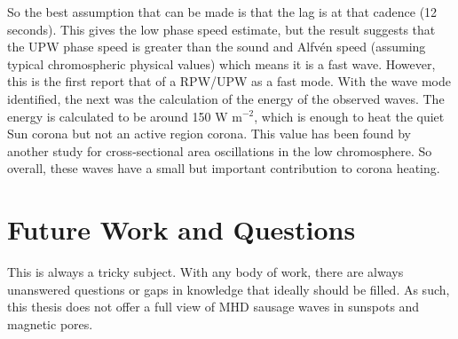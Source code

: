     So the best assumption that can be made is that the lag is at that cadence (12 seconds). 
    This gives the low phase speed estimate, but the result suggests that the UPW phase speed is greater than the sound and Alfv\'en speed (assuming typical chromospheric physical values) which means it is a fast wave. 
    However, this is the first report that of a RPW/UPW as a fast mode.
    With the wave mode identified, the next was the calculation of the energy of the observed waves.
    The energy is calculated to be around 150 W m$^{-2}$, which is enough to heat the quiet Sun corona but not an active region corona.
    This value has been found by another study for cross-sectional area oscillations in the low chromosphere.
    So overall, these waves have a small but important contribution to corona heating.
    
\section{Future Work and Questions}
    
    This is always a tricky subject.
    With any body of work, there are always unanswered questions or gaps in knowledge that ideally should be filled.
    As such, this thesis does not offer a full view of MHD sausage waves in sunspots and magnetic pores.
    
